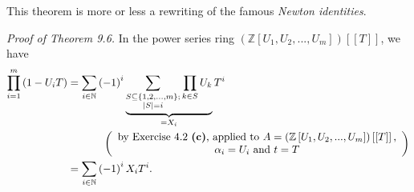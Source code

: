 \documentclass[numbers=enddot,12pt,final,onecolumn,notitlepage]{scrartcl}%
\begin{document}
This theorem is more or less a rewriting of the famous \textit{Newton
identities}.

\textit{Proof of Theorem 9.6.} In the power series ring $\left(
\mathbb{Z}\left[  U_{1},U_{2},...,U_{m}\right]  \right)  \left[  \left[
T\right]  \right]  $, we have%
\begin{align}
\prod\limits_{i=1}^{m}\left(  1-U_{i}T\right)   &  =\sum_{i\in\mathbb{N}%
}\left(  -1\right)  ^{i}\underbrace{\sum_{\substack{S\subseteq\left\{
1,2,...,m\right\}  ;\\\left\vert S\right\vert =i}}\prod\limits_{k\in S}U_{k}%
}_{=X_{i}}T^{i}\nonumber\\
&  \ \ \ \ \ \ \ \ \ \ \left(
\begin{array}
[c]{c}%
\text{by Exercise 4.2 \textbf{(c)}, applied to }A=\left(  \mathbb{Z}\left[
U_{1},U_{2},...,U_{m}\right]  \right)  \left[  \left[  T\right]  \right]
\text{,}\\
\alpha_{i}=U_{i}\text{ and }t=T
\end{array}
\right) \nonumber\\
&  =\sum_{i\in\mathbb{N}}\left(  -1\right)  ^{i}X_{i}T^{i}. \label{9.6.pf0}%
\end{align}
\end{document}
